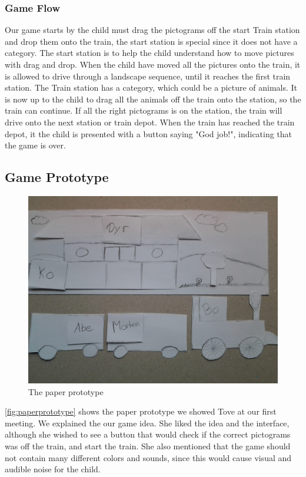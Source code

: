 \subsubsection*{Game Flow}
Our game starts by the child must drag the pictograms off the start Train station and drop them onto the train, the start station is special since it does not have a category. The start station is to help the child understand how to move pictures with drag and drop. When the child have moved all the pictures onto the train, it is allowed to drive through a landscape sequence, until it reaches the first train station.
The Train station has a category, which could be a picture of animals. It is now up to the child to drag all the animals off the train onto the station, so the train can continue. If all the right pictograms is on the station, the train will drive onto the next station or train depot.
When the train has reached the train depot, it the child is presented with a button saying "God job!", indicating that the game is over.

\subsection{Game Prototype}
\begin{figure}[H]
\centering
\includegraphics[width=0.9\linewidth]{img/screenshots/prototype1.jpg}%
\caption{The paper prototype}
\label{fig:paperprototype}
\end{figure}
\autoref{fig:paperprototype} shows the paper prototype we showed Tove at our first meeting. We explained the our game idea. She liked the idea and the interface, although she wished to see a button that would check if the correct pictograms was off the train, and start the train. She also mentioned that the game should not contain many different colors and sounds, since this would cause visual and audible noise for the child.


